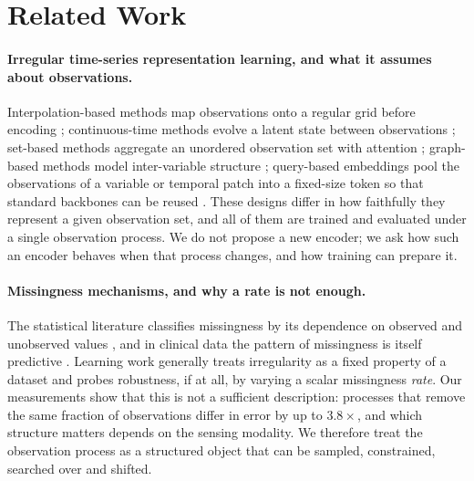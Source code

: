 
\section{Related Work}

\paragraph{Irregular time-series representation learning, and what it assumes about observations.}
Interpolation-based methods map observations onto a regular grid before encoding \cite{shukla2019ipn};
continuous-time methods evolve a latent state between observations
\cite{rubanova2019latentode,debrouwer2019gruodebayes,kidger2020ncde}; set-based methods aggregate an unordered
observation set with attention \cite{horn2020seft,shukla2021mtand}; graph-based methods model inter-variable
structure \cite{zhang2022raindrop,zhang2024tpatchgnn}; query-based embeddings pool the observations of a variable
or temporal patch into a fixed-size token so that standard backbones \cite{liu2024itransformer,nie2023patchtst}
can be reused \cite{lim2026quite}. These designs differ in how faithfully they represent a given observation set,
and all of them are trained and evaluated under a single observation process. We do not propose a new encoder; we
ask how such an encoder behaves when that process changes, and how training can prepare it.

\paragraph{Missingness mechanisms, and why a rate is not enough.}
The statistical literature classifies missingness by its dependence on observed and unobserved values
\cite{rubin1976missing}, and in clinical data the pattern of missingness is itself predictive
\cite{lipton2016informative,che2018grud}. Learning work generally treats irregularity as a fixed property of a
dataset and probes robustness, if at all, by varying a scalar missingness \emph{rate}. Our measurements show that
this is not a sufficient description: processes that remove the same fraction of observations differ in error by
up to $3.8\times$, and which structure matters depends on the sensing modality. We therefore treat the
observation process as a structured object that can be sampled, constrained, searched over and shifted.

